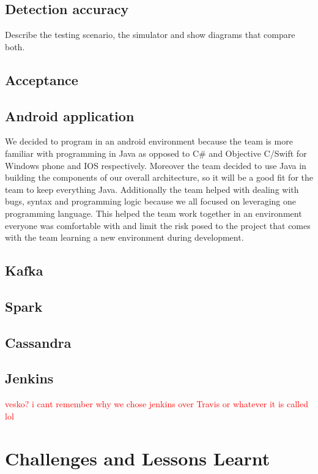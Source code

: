 \documentclass[prodmode,acmtosem]{acmsmall} %
\begin{document}
\subsection{Detection accuracy}
Describe the testing scenario, the simulator and show diagrams that compare both.


\subsection{Acceptance}

\subsection{Android application}
We decided to program in an android environment because the team is more familiar with programming in Java as opposed to C\# and Objective C/Swift for Windows phone and IOS respectively. Moreover the team decided to use Java in building the components of our overall architecture, so it will be a good fit for the team to keep everything Java. Additionally the team helped with dealing with bugs, syntax and programming logic because we all focused on leveraging one programming language. This helped the team work together in an environment everyone was comfortable with and limit the risk posed to the project that comes with the team learning a new environment during development.

\subsection{Kafka}

\subsection{Spark}

\subsection{Cassandra}


\subsection{Jenkins}
\textcolor{red}{vesko? i cant remember why we chose jenkins over Travis or whatever it is called lol}

\section{Challenges and Lessons Learnt}
\end{document}

